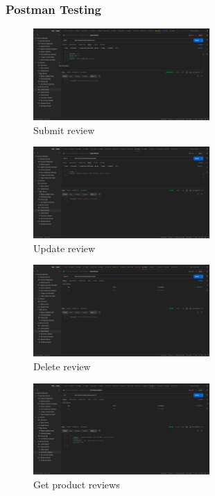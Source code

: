 \documentclass[a4paper,12pt]{article}
\begin{document}
\subsubsection{Postman Testing}
\begin{figure}[H]
  \centering
  \includegraphics[width=0.6\textwidth]{images/15.png}
  \caption{Submit review}
\end{figure}
\begin{figure}[H]
  \centering
  \includegraphics[width=0.6\textwidth]{images/16.png}
  \caption{Update review}
\end{figure}
\begin{figure}[H]
  \centering
  \includegraphics[width=0.6\textwidth]{images/17.png}
  \caption{Delete review}
\end{figure}
\begin{figure}[H]
  \centering
  \includegraphics[width=0.6\textwidth]{images/18.png}
  \caption{Get product reviews}
\end{figure}
\end{document}
